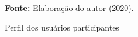 \begin{figure}[ht!]
\centering

\caption{\textmd{Perfil dos usuários participantes}}
\label{fig:perfilusuarios}

\par\medskip\textbf{Fonte:} Elaboração do autor (2020). \par\medskip

\end{figure}

